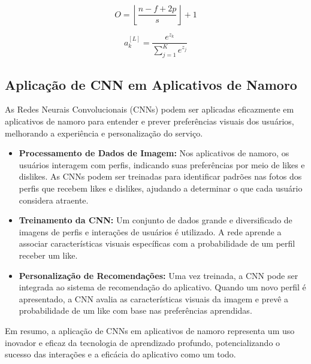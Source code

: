 \begin{equation}
O = \left\lfloor \frac{n - f + 2p}{s} \right\rfloor + 1
\end{equation}

\begin{equation}
a^{[L]}_k = \frac{e^{z_k}}{\sum_{j=1}^{K} e^{z_j}}
\end{equation}

\subsection{Aplicação de CNN em Aplicativos de Namoro}

As Redes Neurais Convolucionais (CNNs) podem ser aplicadas eficazmente em aplicativos de namoro para entender e prever preferências visuais dos usuários, melhorando a experiência e personalização do serviço.

\begin{itemize}
    \item \textbf{Processamento de Dados de Imagem:}  
    Nos aplicativos de namoro, os usuários interagem com perfis, indicando suas preferências por meio de likes e dislikes. As CNNs podem ser treinadas para identificar padrões nas fotos dos perfis que recebem likes e dislikes, ajudando a determinar o que cada usuário considera atraente.

    \item \textbf{Treinamento da CNN:}  
    Um conjunto de dados grande e diversificado de imagens de perfis e interações de usuários é utilizado. A rede aprende a associar características visuais específicas com a probabilidade de um perfil receber um like.

    \item \textbf{Personalização de Recomendações:}  
    Uma vez treinada, a CNN pode ser integrada ao sistema de recomendação do aplicativo. Quando um novo perfil é apresentado, a CNN avalia as características visuais da imagem e prevê a probabilidade de um like com base nas preferências aprendidas.
\end{itemize}

Em resumo, a aplicação de CNNs em aplicativos de namoro representa um uso inovador e eficaz da tecnologia de aprendizado profundo, potencializando o sucesso das interações e a eficácia do aplicativo como um todo.
